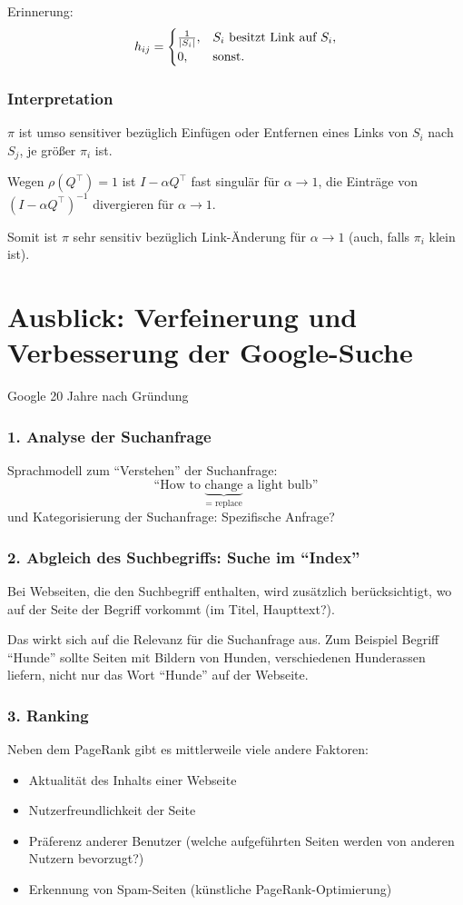 Erinnerung:
\[ h_{ij} = \begin{cases}
    \frac{1}{|S_i|}, & S_i \text{ besitzt Link auf } S_i, \\
    0, & \text{sonst.}
  \end{cases}
\]

\subsubsection*{Interpretation}
$\pi$ ist umso sensitiver bezüglich Einfügen oder Entfernen eines Links von
$S_i$ nach $S_j$, je größer $\pi_i$ ist.

Wegen $\rho(Q^\top) = 1$ ist $I - \alpha Q^\top$ fast singulär für $\alpha \to
1$, die Einträge von $(I - \alpha Q^\top)^{-1}$ divergieren für $\alpha \to 1$.

Somit ist $\pi$ sehr sensitiv bezüglich Link-Änderung für $\alpha \to 1$ (auch,
falls $\pi_i$ klein ist).

\section{Ausblick: Verfeinerung und Verbesserung der Google-Suche}
Google 20 Jahre nach Gründung

\subsubsection*{1. Analyse der Suchanfrage}
Sprachmodell zum ``Verstehen'' der Suchanfrage:
\[ \text{``How to } \underbrace{\text{change}}_{= \text{ replace}} \text{ a
    light bulb''} \]
und Kategorisierung der Suchanfrage: Spezifische Anfrage?

\subsubsection*{2. Abgleich des Suchbegriffs: Suche im ``Index''}
Bei Webseiten, die den Suchbegriff enthalten, wird zusätzlich berücksichtigt, wo
auf der Seite der Begriff vorkommt (im Titel, Haupttext?).

Das wirkt sich auf die Relevanz für die Suchanfrage aus. Zum Beispiel Begriff
``Hunde'' sollte Seiten mit Bildern von Hunden, verschiedenen Hunderassen
liefern, nicht nur das Wort ``Hunde'' auf der Webseite.

\subsubsection*{3. Ranking}
Neben dem PageRank gibt es mittlerweile viele andere Faktoren:
\begin{itemize}
\item Aktualität des Inhalts einer Webseite
\item Nutzerfreundlichkeit der Seite
\item Präferenz anderer Benutzer (welche aufgeführten Seiten werden von anderen
  Nutzern bevorzugt?)
\item Erkennung von Spam-Seiten (künstliche PageRank-Optimierung)
\end{itemize}

